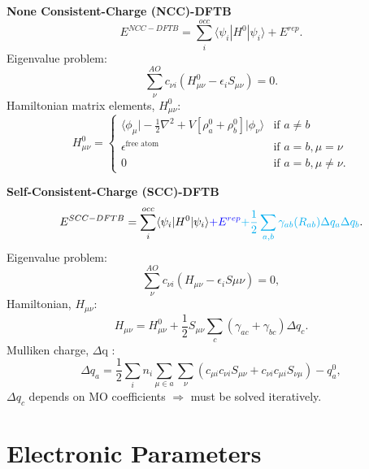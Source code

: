 \textbf{None Consistent-Charge (NCC)-DFTB\\}
\begin{equation} 
  E^{NCC-DFTB}=\sum_i^{occ}\langle\psi_i|H^0|\psi_i\rangle + E^{rep}.
  \label{eq:nccdftb}
\end{equation}
Eigenvalue problem:
\begin{equation} 
  \sum_\nu^{AO}c_{\nu i}(H^0_{\mu\nu}-\epsilon_iS_{\mu\nu})= 0.
\end{equation}
Hamiltonian matrix elements, $H^0_{\mu\nu}$:
\begin{equation} 
  H^0_{\mu\nu}=
  \begin{cases}
    \big\langle\phi_\mu\big|-\frac{1}{2}\nabla^2+V[\rho^0_a+\rho^0_b]\big|\phi_\nu\big\rangle& \text{if } a \ne b \\
    \epsilon^{\text{free atom}}                                                            & \text{if } a=b, \mu = \nu\\
    0                                                                                      & \text{if } a=b, \mu \ne \nu.
  \end{cases}
\end{equation}

\textbf{Self-Consistent-Charge (SCC)-DFTB\\}
\begin{equation} 
  E^{SCC-DFTB}=\sum_i^{occ}\langle\psi_i|H^0|\psi_i\rangle {\color{blue}+ E^{rep}} {\color{cyan} + \frac{1}{2}\sum_{a,b}\gamma_{ab}(R_{ab})\Delta q_a \Delta q_b}.
  \label{eq:sccdftb}
\end{equation}
Eigenvalue problem:  
\begin{equation} 
  \sum_\nu^{AO}c_{\nu i}(H_{\mu\nu}-\epsilon_iS{\mu\nu})= 0,
  \label{eq:eigsccdftb}
\end{equation}
Hamiltonian, $H_{\mu\nu}$:
\begin{equation} 
  H_{\mu\nu} = H^0_{\mu\nu} + \frac{1}{2}S_{\mu\nu}\sum_{c}(\gamma_{ac}+\gamma_{bc})\Delta q_c.
\end{equation}
 Mulliken charge, $\Delta$q :
  \begin{equation}
    \Delta q_a = \frac{1}{2}\sum_i n_i \sum_{\mu\in a}\sum_{\nu}(c_{\mu i}c_{\nu i}S_{\mu\nu}+c_{\nu i}c_{\mu i}S_{\nu\mu})
      -q_a^0,
  \end{equation}
$\Delta q_c$ depends on MO coefficients $\Rightarrow$ must be solved iteratively.

\section{Electronic Parameters}


